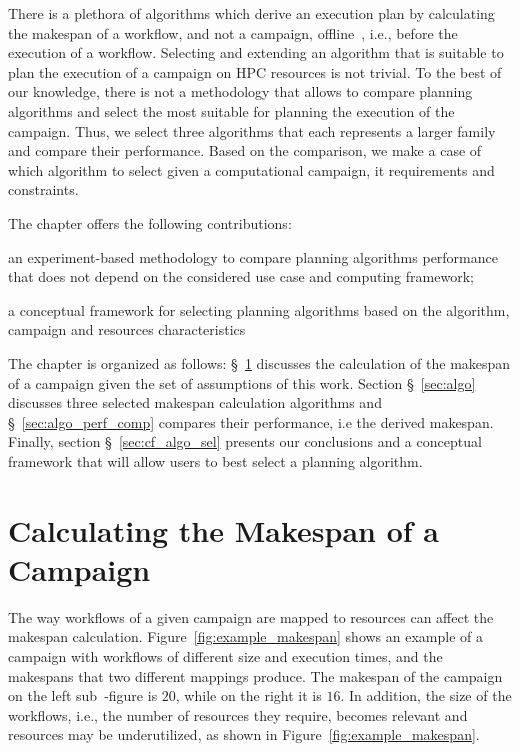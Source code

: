 There is a plethora of algorithms which derive an execution plan by calculating the makespan of a workflow, and not a campaign, offline~\cite{lu2019review}, i.e., before the execution of a workflow.
Selecting and extending an algorithm that is suitable to plan the execution of a campaign on HPC resources is not trivial.
To the best of our knowledge, there is not a methodology that allows to compare planning algorithms and select the most suitable for planning the execution of the campaign.
Thus, we select three algorithms that each represents a larger family and compare their performance.
Based on the comparison, we make a case of which algorithm to select given a computational campaign, it requirements and constraints.

The chapter offers the following contributions:
\begin{inparaenum}[i)]
    \item an experiment-based methodology to compare planning algorithms performance that does not depend on the considered use case and computing framework;
    \item a conceptual framework for selecting planning algorithms based on the algorithm, campaign and resources characteristics
\end{inparaenum}

The chapter is organized as follows: \S~\ref{sec:makespan_calc} discusses the calculation of the makespan of a campaign given the set of assumptions of this work.
Section \S~\ref{sec:algo} discusses three selected makespan calculation algorithms and \S~\ref{sec:algo_perf_comp} compares their performance, i.e the derived makespan.
Finally, section \S~\ref{sec:cf_algo_sel} presents our conclusions and a conceptual framework that will allow users to best select a planning algorithm.

\section{Calculating the Makespan of a Campaign}
\label{sec:makespan_calc}
The way workflows of a given campaign are mapped to resources can affect the makespan calculation. 
Figure~\ref{fig:example_makespan} shows an example of a campaign with workflows of different size and execution times, and the makespans that two different mappings produce.
The makespan of the campaign on the left sub~-figure is $20$, while on the right it is $16$.
In addition, the size of the workflows, i.e., the number of resources they require, becomes relevant and resources may be underutilized, as shown in Figure~\ref{fig:example_makespan}.


